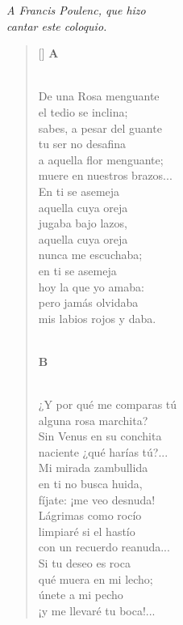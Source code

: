 



\settowidth{\versewidth}{Muere en nuestros brazos...}

\bigskip

\begin{flushright}
\scriptsize\emph{A Francis Poulenc, que hizo} \\
\emph{cantar este coloquio.}
\end{flushright}

\bigskip

\begin{verse}[\versewidth]
\qquad\qquad\textbf{A} \\ \

De una Rosa menguante \\
el tedio se inclina; \\
sabes, a pesar del guante \\
tu ser no desafina \\
a aquella flor menguante; \\
muere en nuestros brazos... \\
En ti se asemeja \\
aquella cuya oreja \\
jugaba bajo lazos, \\
aquella cuya oreja \\
nunca me escuchaba; \\
en ti se asemeja \\
hoy la que yo amaba: \\
pero jamás olvidaba \\
mis labios rojos y daba.
\\ \

\qquad\qquad\textbf{B} \\ \

¿Y por qué me comparas tú \\
alguna rosa marchita? \\
Sin Venus en su conchita \\
naciente ¿qué harías tú?... \\
Mi mirada zambullida \\
en ti no busca huida, \\
fíjate: ¡me veo desnuda! \\
Lágrimas como rocío \\
limpiaré si el hastío \\
con un recuerdo reanuda... \\
Si tu deseo es roca \\
qué muera en mi lecho; \\
únete a mi pecho \\
¡y me llevaré tu boca!...
\end{verse}

